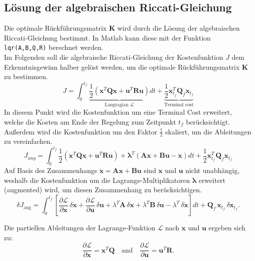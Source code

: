 \subsection{Lösung der algebraischen Riccati-Gleichung}
\label{subsec:riccati_gleichung}
Die optimale Rückführungsmatrix $\mathbf{K}$ wird durch die Lösung der algebraischen Riccati-Gleichung 
bestimmt. In Matlab kann diese mit der Funktion \texttt{lqr(A,B,Q,R)} berechnet werden.
\\
Im Folgenden soll die algebraische Riccati-Gleichung der Kostenfunktion $J$ dem Erkenntnisgewinn halber gelöst werden, um die optimale Rückführungsmatrix $\mathbf{K}$ zu bestimmen.
\begin{equation}
J = \int_{0}^{t_f} \underbrace{\frac{1}{2} \left( \mathbf{x}^{T} \mathbf{Q} \mathbf{x} + \mathbf{u}^{T} \mathbf{R} \mathbf{u} \right)}_{\text{Langragian }\mathcal{L}} dt 
+ \underbrace{\frac{1}{2}\mathbf{x}_{t_f}^{T} \mathbf{Q}_f \mathbf{x}_{t_f}}_{\text{Terminal cost}}
\end{equation}
In diesem Punkt wird die Kostenfunktion um eine Terminal Cost erweitert, welche die Kosten am Ende der Regelung zum Zeitpunkt $t_f$ berücksichtigt. Außerdem wird die Kostenfunktion um den Faktor $\frac{1}{2}$ skaliert, um die Ableitungen zu vereinfachen.
\begin{equation}
J_{aug} = \int_{0}^{t_f} \frac{1}{2} \left( \mathbf{x}^{T} \mathbf{Q} \mathbf{x} + \mathbf{u}^{T} \mathbf{R} \mathbf{u} \right) + \mathbf{\lambda}^T (\mathbf{Ax} + \mathbf{Bu} - \dot{\mathbf{x}}) dt 
+ {\frac{1}{2}\mathbf{x}_{t_f}^{T} \mathbf{Q}_f \mathbf{x}_{t_f}}
\end{equation}
Auf Basis des Zusammenhangs $\dot{\mathbf{x}} = \mathbf{Ax} + \mathbf{B} \mathbf{u}$ sind $\mathbf{x}$ und $\mathbf{u}$ nicht unabhängig, weshalb die Kostenfunktion um die Lagrange-Multiplikatoren $\mathbf{\lambda}$ erweitert (augmented) wird, um diesen Zusammenhang zu berücksichtigen.
\begin{equation}
    \delta J_{\text{aug}} =
\int_{0}^{t_f}
\left[
\frac{\partial \mathcal{L}}{\partial \mathbf{x}}\,\delta \mathbf{x}
+
\frac{\partial \mathcal{L}}{\partial \mathbf{u}}\,\delta \mathbf{u}
+
\lambda^{T} \mathbf{A}\,\delta \mathbf{x}
+
\lambda^{T} \mathbf{B}\,\delta \mathbf{u}
-
\lambda^{T}\,\delta \dot{\mathbf{x}}
\right] dt
+
\mathbf{Q}_f\,\mathbf{x}_{t_f}\,\delta \mathbf{x}_{t_f}.
\end{equation}

Die partiellen Ableitungen der Lagrange-Funktion $\mathcal{L}$ nach $\mathbf{x}$ und $\mathbf{u}$ ergeben sich zu:
\begin{equation}
  \frac{\partial \mathcal{L}}{\partial \mathbf{x}} = \mathbf{x}^{T} \mathbf{Q}
\quad \text{and} \quad
\frac{\partial \mathcal{L}}{\partial \mathbf{u}} = \mathbf{u}^{T} \mathbf{R} .  
\end{equation}

